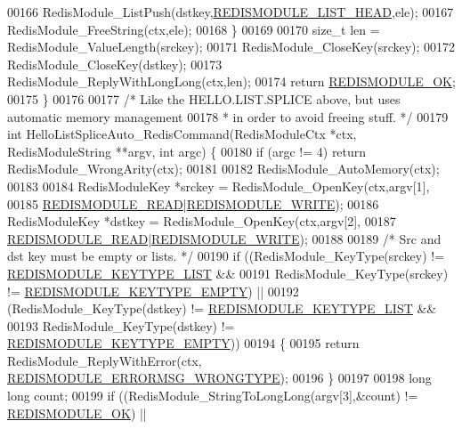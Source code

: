 \begin{DoxyCode}
00166         RedisModule\_ListPush(dstkey,\hyperlink{redismodule_8h_a6ca6298fda4f019c7585d34b870fd5f1}{REDISMODULE\_LIST\_HEAD},ele);
00167         RedisModule\_FreeString(ctx,ele);
00168     \}
00169 
00170     size\_t len = RedisModule\_ValueLength(srckey);
00171     RedisModule\_CloseKey(srckey);
00172     RedisModule\_CloseKey(dstkey);
00173     RedisModule\_ReplyWithLongLong(ctx,len);
00174     \textcolor{keywordflow}{return} \hyperlink{redismodule_8h_a1bc5bfd69abcd378ff52c640adc5418d}{REDISMODULE\_OK};
00175 \}
00176 
00177 \textcolor{comment}{/* Like the HELLO.LIST.SPLICE above, but uses automatic memory management}
00178 \textcolor{comment}{ * in order to avoid freeing stuff. */}
00179 \textcolor{keywordtype}{int} HelloListSpliceAuto\_RedisCommand(RedisModuleCtx *ctx, RedisModuleString **argv, \textcolor{keywordtype}{int} argc) \{
00180     \textcolor{keywordflow}{if} (argc != 4) \textcolor{keywordflow}{return} RedisModule\_WrongArity(ctx);
00181 
00182     RedisModule\_AutoMemory(ctx);
00183 
00184     RedisModuleKey *srckey = RedisModule\_OpenKey(ctx,argv[1],
00185         \hyperlink{redismodule_8h_a369d2ff4bca768b05f826a12dd694825}{REDISMODULE\_READ}|\hyperlink{redismodule_8h_a73b37117ef94cb4a904361afcc51b6b4}{REDISMODULE\_WRITE});
00186     RedisModuleKey *dstkey = RedisModule\_OpenKey(ctx,argv[2],
00187         \hyperlink{redismodule_8h_a369d2ff4bca768b05f826a12dd694825}{REDISMODULE\_READ}|\hyperlink{redismodule_8h_a73b37117ef94cb4a904361afcc51b6b4}{REDISMODULE\_WRITE});
00188 
00189     \textcolor{comment}{/* Src and dst key must be empty or lists. */}
00190     \textcolor{keywordflow}{if} ((RedisModule\_KeyType(srckey) != \hyperlink{redismodule_8h_a4c01058971d9d8fe1cfa02071fa87fa6}{REDISMODULE\_KEYTYPE\_LIST} &&
00191          RedisModule\_KeyType(srckey) != \hyperlink{redismodule_8h_adf2819748eb5e89c621d2c9c65c0b5f7}{REDISMODULE\_KEYTYPE\_EMPTY}) ||
00192         (RedisModule\_KeyType(dstkey) != \hyperlink{redismodule_8h_a4c01058971d9d8fe1cfa02071fa87fa6}{REDISMODULE\_KEYTYPE\_LIST} &&
00193          RedisModule\_KeyType(dstkey) != \hyperlink{redismodule_8h_adf2819748eb5e89c621d2c9c65c0b5f7}{REDISMODULE\_KEYTYPE\_EMPTY}))
00194     \{
00195         \textcolor{keywordflow}{return} RedisModule\_ReplyWithError(ctx,
      \hyperlink{redismodule_8h_ab897689b0673a1e4cbc097cb5bce04c1}{REDISMODULE\_ERRORMSG\_WRONGTYPE});
00196     \}
00197 
00198     \textcolor{keywordtype}{long} \textcolor{keywordtype}{long} count;
00199     \textcolor{keywordflow}{if} ((RedisModule\_StringToLongLong(argv[3],&count) != \hyperlink{redismodule_8h_a1bc5bfd69abcd378ff52c640adc5418d}{REDISMODULE\_OK}) ||

\end{DoxyCode}
